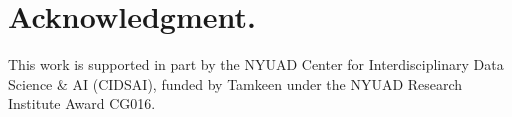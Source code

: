\documentclass[12pt,final]{amsart}
\newcommand{\1}{\mathbf{1}}
\begin{document}
\section*{Acknowledgment.}
This work is supported in part by the NYUAD Center for Interdisciplinary Data Science \& AI (CIDSAI), funded by Tamkeen under the NYUAD Research Institute Award CG016.


\end{document}
